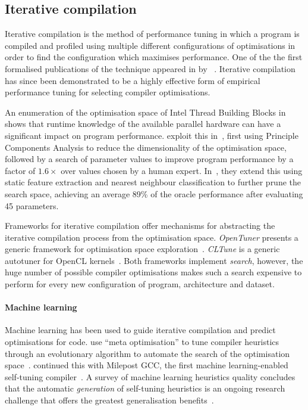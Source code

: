 \subsection{Iterative compilation}

Iterative compilation is the method of performance tuning in which a program is compiled and profiled using multiple different configurations of optimisations in order to find the configuration which maximises performance. One of the the first formalised publications of the technique appeared in \citeyear{Bodin1998} by \citeauthor{Bodin1998}~\cite{Bodin1998}. Iterative compilation has since been demonstrated to be a highly effective form of empirical performance tuning for selecting compiler optimisations.

An enumeration of the optimisation space of Intel Thread Building Blocks in~\cite{Contreras2008} shows that runtime knowledge of the available parallel hardware can have a significant impact on program performance. \citeauthor{Collins2012} exploit this in~\cite{Collins2012}, first using Principle Components Analysis to reduce the dimensionality of the optimisation space, followed by a search of parameter values to improve program performance by a factor of $1.6\times$ over values chosen by a human expert. In~\cite{Collins2013}, they extend this using static feature extraction and nearest neighbour classification to further prune the search space, achieving an average 89\% of the oracle performance after evaluating 45 parameters.

Frameworks for iterative compilation offer mechanisms for abstracting the iterative compilation process from the optimisation space. \emph{OpenTuner} presents a generic framework for optimisation space exploration~\cite{Ansel2013}. \emph{CLTune} is a generic autotuner for OpenCL kernels~\cite{Nugteren2015}. Both frameworks implement \emph{search}, however, the huge number of possible compiler optimisations makes such a search expensive to perform for every new configuration of program, architecture and dataset.

\paragraph{Machine learning} Machine learning has been used to guide iterative compilation and predict optimisations for code. \citeauthor{Stephenson2003} use ``meta optimisation'' to tune compiler heuristics through an evolutionary algorithm to automate the search of the optimisation space~\cite{Stephenson2003}. \citeauthor{Fursin2011} continued this with Milepost GCC, the first machine learning-enabled self-tuning compiler~\cite{Fursin2011}. A survey of machine learning heuristics quality concludes that the automatic \emph{generation} of self-tuning heuristics is an ongoing research challenge that offers the greatest generalisation benefits~\cite{Burke2013}.

